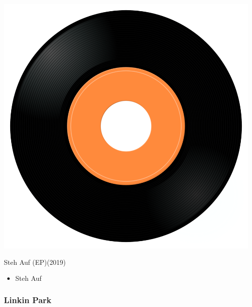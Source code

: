 \begin{minipage}[t]{0.25\textwidth}
\captionsetup{type=figure}
\includegraphics[width=\textwidth]{Images/cover.png}
\caption*{Steh Auf (EP)(2019)}
\end{minipage}
\begin{minipage}[t]{0.25\textwidth}\vspace{0pt}
\begin{itemize}[nosep,leftmargin=1em,labelwidth=*,align=left]
	\setlength{\itemsep}{0pt}
	\item Steh Auf
\end{itemize}
\end{minipage}

\subsubsection{Linkin Park}

